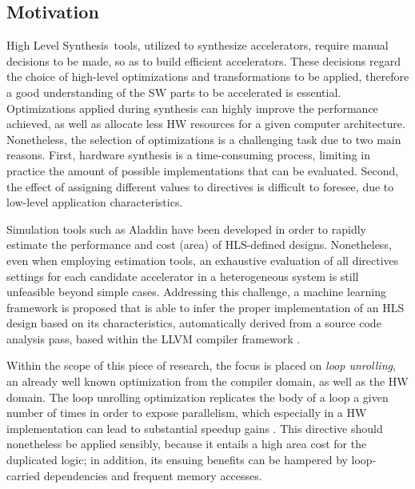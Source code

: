 \documentclass[]{usiinfthesis}
\newcommand{\HLS}{{High Level Synthesis}}
\begin{document}
\subsection{Motivation}

\HLS\ tools, utilized to synthesize accelerators, require manual decisions to be made, so as 
to build efficient accelerators. These decisions regard the choice of high-level optimizations 
and transformations to be applied, therefore a good understanding of the SW parts to be 
accelerated is essential. Optimizations applied during synthesis can highly improve the performance 
achieved, as well as allocate less HW resources for a given computer architecture. Nonetheless, 
the selection of optimizations is a challenging task due to two main reasons. 
First, hardware synthesis is a time-consuming process, limiting in practice the amount of 
possible implementations that can be evaluated. Second, the effect of assigning different values to 
directives is difficult to foresee, due to low-level application characteristics.\par

Simulation tools such as Aladdin \cite{ShaoJul14} have been developed in order to rapidly 
estimate the performance and cost (area) of HLS-defined designs. Nonetheless, even when employing 
estimation tools, an exhaustive evaluation of all directives settings for
each candidate accelerator in a heterogeneous system is still unfeasible beyond simple cases. Addressing
this challenge, a machine learning framework is proposed that
is able to infer the proper implementation of an HLS design based on its characteristics,
automatically derived from a source code analysis pass, based within the
LLVM compiler framework \cite{LattnerMar04}.\par


Within the scope of this piece of research, the focus is placed on {\em loop unrolling}, an already 
well known optimization from the compiler domain, as well as the HW domain.
The loop unrolling optimization replicates the body of a loop a given number of times 
in order to expose parallelism, which especially in a HW implementation can lead to 
substantial speedup gains \cite{KurraApr07}. 
This directive should nonetheless be applied sensibly, because it entails a high area cost for the 
duplicated logic; in addition, its ensuing benefits can be hampered by loop-carried dependencies 
and frequent memory accesses.\par
\end{document}
